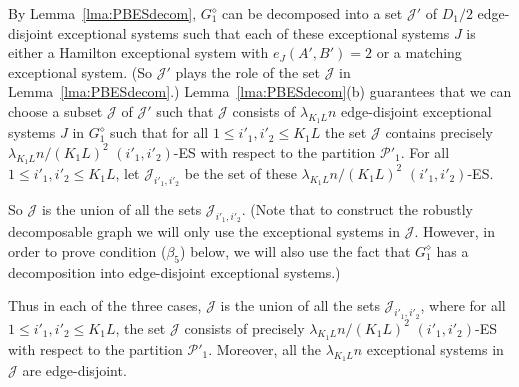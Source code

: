 \documentclass{memo-l}
\def\COMMENT#1{}
\def\cP{\mathcal{P}}
\def\cJ{\mathcal{J}}
\numberwithin{section}{chapter}
\numberwithin{equation}{section}
\numberwithin{firstthm}{section}
\numberwithin{figure}{section}
\begin{document}
{By Lemma~\ref{lma:PBESdecom}, $G^{\diamond}_1$ can be decomposed into a set $\cJ'$ of $D_1/2$ edge-disjoint exceptional systems
such that each of these exceptional systems $J$ is either a Hamilton exceptional system with $e_{J}(A',B') = 2$ or a matching exceptional system.
(So $\cJ'$ plays the role of the set $\cJ$ in Lemma~\ref{lma:PBESdecom}.)
Lemma~\ref{lma:PBESdecom}(b) guarantees that we can choose a subset $\cJ$ of $\cJ'$ such that $\cJ$ consists of $\lambda_{K_1L} n$
edge-disjoint exceptional systems $J$ in $G^\diamond_1$ such that for all $1 \le i'_1, i'_2  \le K_1L$ the set $\cJ$ contains precisely
$\lambda_{K_1L} n/(K_1 L)^2$ $(i'_1,i'_2)$-ES with respect to the partition $\cP'_1$.
For all $1 \le i'_1, i'_2  \le K_1L$, let $\cJ_{i'_1,i'_2}$ be the set of these $\lambda_{K_1L} n/(K_1 L)^2$ $(i'_1,i'_2)$-ES.%
     \COMMENT{Note that when $e_G(A',B')< D$, we do not require $\cJ_{i'_1,i'_2}$ contains as many HES (or MES) as possible.}
So $\cJ$ is the union of all the sets $\cJ_{i'_1,i'_2}$. (Note that to construct the robustly decomposable graph we will only use the exceptional systems in $\cJ$.
However, in order to prove condition ($\beta_5$) below, we will also use the fact that $G^{\diamond}_1$ has a decomposition into edge-disjoint exceptional systems.)

\smallskip

Thus in each of the three cases, $\cJ$ is the union of all the sets $\cJ_{i'_1,i'_2}$, where for all $1 \le i'_1, i'_2  \le K_1L$,
the set $\cJ$ consists of precisely $\lambda_{K_1L} n/(K_1 L)^2$ $(i'_1,i'_2)$-ES with respect to the partition $\cP'_1$.
Moreover, all the $\lambda_{K_1L} n$ exceptional systems in $\cJ$ are edge-disjoint.

}
\end{document}
